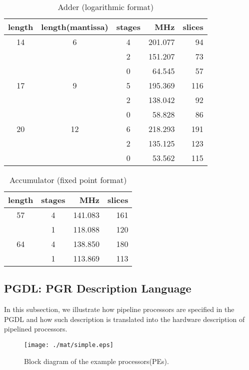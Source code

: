 \documentclass[times, 10pt,twocolumn]{article}
\begin{document}
\begin{table}
\caption{Adder (logarithmic format)}
\begin{center}
\begin{tabular}{cccrr}
\hline
\hline
length  & length(mantissa) & stages & MHz & slices\\
\hline
14   &  6 & 4 & 201.077 & 94 \\
     &    & 2 & 151.207 & 73 \\
     &    & 0 &  64.545 & 57 \\
\hline
17   &  9 & 5 & 195.369 & 116 \\
     &    & 2 & 138.042 &  92 \\
     &    & 0 &  58.828 &  86 \\
\hline
20   & 12 & 6 & 218.293 & 191 \\
     &    & 2 & 135.125 & 123 \\
     &    & 0 &  53.562 & 115 \\
\hline
\hline
\end{tabular}
\end{center}
\label{tabpg_log_unsigned_add}
\end{table}

\begin{table}
\caption{Accumulator (fixed point format)}
\begin{center}
\begin{tabular}{ccrr}
\hline
\hline
length  & stages & MHz & slices\\
\hline
57   &  4 & 141.083 & 161 \\
     &  1 & 118.088 & 120 \\
\hline
64   &  4 & 138.850 & 180 \\
     &  1 & 113.869 & 113 \\
\hline
\hline
\end{tabular}
\end{center}
\label{tabpg_fix_accum}
\end{table}



\subsection{PGDL: PGR Description Language}
In this subsection, we illustrate how pipeline processors are
specified in the PGDL and how such description is translated
into the hardware description of pipelined processors.

\begin{figure}[htb]
\begin{center}
\texttt{[image: ./mat/simple.eps]}
\caption{Block diagram of the example processors(PEs).}
\label{fig4}
\end{center}
\end{figure}
\end{document}
